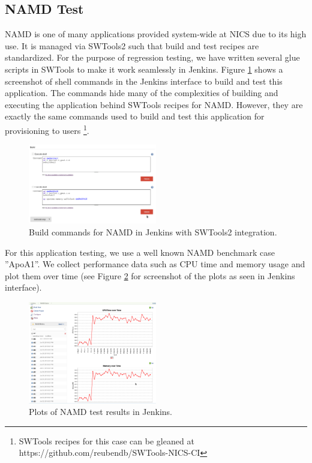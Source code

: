 \documentclass[AMA]{WileyNJD-v1}
\begin{document}
\subsection{NAMD Test}
NAMD is one of many applications provided system-wide at NICS due to its high use. It is managed via SWTools2 \cite{SWTools2} such that build and test recipes are standardized. For the purpose of regression testing, we have written several glue scripts in SWTools to make it work seamlessly in Jenkins. Figure \ref{fig:NAMD-jenkins} shows a screenshot of shell commands in the Jenkins interface to build and test this application. The commands hide many of the complexities of building and executing the application behind SWTools recipes for NAMD. However, they are exactly the same commands used to build and test this application for provisioning to users \footnote{SWTools recipes for this case can be gleaned at  https://github.com/reubendb/SWTools-NICS-CI}.

\begin{figure}[H]
\centering
\includegraphics[width=0.5\textwidth]{NAMD-Jenkins}
\caption{Build commands for NAMD in Jenkins with SWTools2 integration.}
\label{fig:NAMD-jenkins}
\end{figure}

For this application testing, we use a well known NAMD benchmark case ''ApoA1''. We collect performance data such as CPU time and memory usage and plot them over time (see Figure \ref{fig:NAMDPlot} for screenshot of the plots as seen in Jenkins interface). 

\begin{figure}[H]
\centering
\includegraphics[width=0.5\textwidth]{NAMDPlot}
\caption{Plots of NAMD test results in Jenkins.}
\label{fig:NAMDPlot}
\end{figure}
\end{document}
